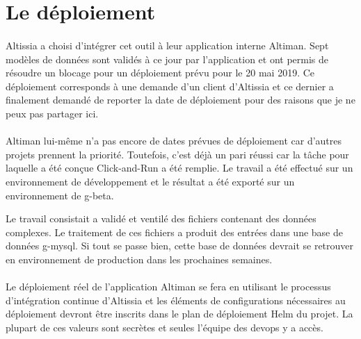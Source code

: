 \section{Le déploiement}
\label{sec:deployment}

\paragraph{}
Altissia a choisi d'intégrer cet outil à leur application interne Altiman\fnmark{}.
Sept modèles de données sont validés à ce jour par l'application et ont permis de résoudre un blocage pour un déploiement prévu pour le 20 mai 2019.
Ce déploiement corresponds à une demande d'un client d'Altissia et ce dernier a finalement demandé de reporter la date de déploiement pour des raisons que je ne peux pas partager ici.

\paragraph{}
Altiman lui-même n'a pas encore de dates prévues de déploiement car d'autres projets prennent la priorité.
Toutefois, c'est déjà un pari réussi car la tâche pour laquelle a été conçue Click-and-Run a été remplie.
Le travail a été effectué sur un environnement de développement et le résultat a été exporté sur un environnement de \gls{g-beta}.

Le travail consistait a validé et ventilé des fichiers contenant des données complexes.
Le traitement de ces fichiers a produit des entrées dans une base de données \gls{g-mysql}.
Si tout se passe bien, cette base de données devrait se retrouver en environnement de production dans les prochaines semaines.

\paragraph{}
Le déploiement réel de l'application Altiman se fera en utilisant le processus d'intégration continue d'Altissia et les éléments de configurations nécessaires au déploiement devront être inscrits dans le plan de déploiement Helm\fnmark{} du projet.
La plupart de ces valeurs sont secrètes et seules l'équipe des devops\fnmark{} y a accès.
